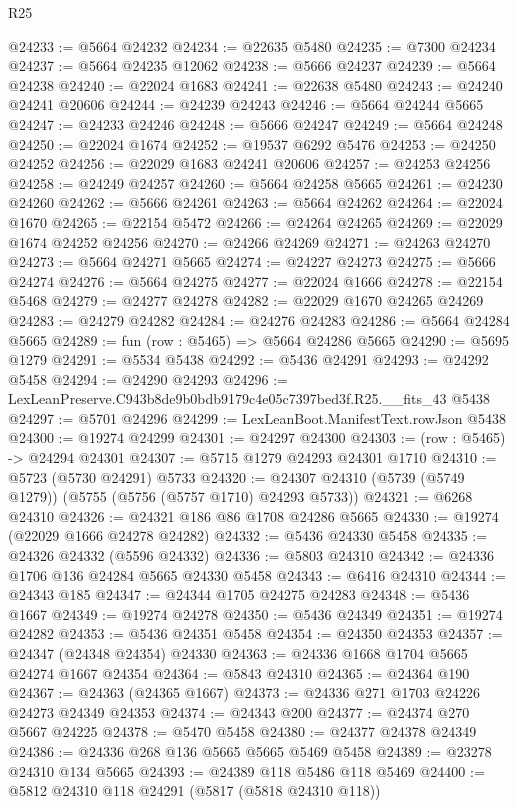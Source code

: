 \begin{lexlean}{R25}
\begin{coremodule}
@24233 := @5664 @24232
@24234 := @22635 @5480
@24235 := @7300 @24234
@24237 := @5664 @24235 @12062
@24238 := @5666 @24237
@24239 := @5664 @24238
@24240 := @22024 @1683
@24241 := @22638 @5480
@24243 := @24240 @24241 @20606
@24244 := @24239 @24243
@24246 := @5664 @24244 @5665
@24247 := @24233 @24246
@24248 := @5666 @24247
@24249 := @5664 @24248
@24250 := @22024 @1674
@24252 := @19537 @6292 @5476
@24253 := @24250 @24252
@24256 := @22029 @1683 @24241 @20606
@24257 := @24253 @24256
@24258 := @24249 @24257
@24260 := @5664 @24258 @5665
@24261 := @24230 @24260
@24262 := @5666 @24261
@24263 := @5664 @24262
@24264 := @22024 @1670
@24265 := @22154 @5472
@24266 := @24264 @24265
@24269 := @22029 @1674 @24252 @24256
@24270 := @24266 @24269
@24271 := @24263 @24270
@24273 := @5664 @24271 @5665
@24274 := @24227 @24273
@24275 := @5666 @24274
@24276 := @5664 @24275
@24277 := @22024 @1666
@24278 := @22154 @5468
@24279 := @24277 @24278
@24282 := @22029 @1670 @24265 @24269
@24283 := @24279 @24282
@24284 := @24276 @24283
@24286 := @5664 @24284 @5665
@24289 := fun (row : @5465) => @5664 @24286 @5665
@24290 := @5695 @1279
@24291 := @5534 @5438
@24292 := @5436 @24291
@24293 := @24292 @5458
@24294 := @24290 @24293
@24296 := LexLeanPreserve.C943b8de9b0bdb9179c4e05c7397bed3f.R25.__fits_43 @5438
@24297 := @5701 @24296
@24299 := LexLeanBoot.ManifestText.rowJson @5438
@24300 := @19274 @24299
@24301 := @24297 @24300
@24303 := (row : @5465) -> @24294 @24301
@24307 := @5715 @1279 @24293 @24301 @1710
@24310 := @5723 (@5730 @24291) @5733
@24320 := @24307 @24310 (@5739 (@5749 @1279)) (@5755 (@5756 (@5757 @1710) @24293 @5733))
@24321 := @6268 @24310
@24326 := @24321 @186 @86 @1708 @24286 @5665
@24330 := @19274 (@22029 @1666 @24278 @24282)
@24332 := @5436 @24330 @5458
@24335 := @24326 @24332 (@5596 @24332)
@24336 := @5803 @24310
@24342 := @24336 @1706 @136 @24284 @5665 @24330 @5458
@24343 := @6416 @24310
@24344 := @24343 @185
@24347 := @24344 @1705 @24275 @24283
@24348 := @5436 @1667
@24349 := @19274 @24278
@24350 := @5436 @24349
@24351 := @19274 @24282
@24353 := @5436 @24351 @5458
@24354 := @24350 @24353
@24357 := @24347 (@24348 @24354) @24330
@24363 := @24336 @1668 @1704 @5665 @24274 @1667 @24354
@24364 := @5843 @24310
@24365 := @24364 @190
@24367 := @24363 (@24365 @1667)
@24373 := @24336 @271 @1703 @24226 @24273 @24349 @24353
@24374 := @24343 @200
@24377 := @24374 @270 @5667 @24225
@24378 := @5470 @5458
@24380 := @24377 @24378 @24349
@24386 := @24336 @268 @136 @5665 @5665 @5469 @5458
@24389 := @23278 @24310 @134 @5665
@24393 := @24389 @118 @5486 @118 @5469
@24400 := @5812 @24310 @118 @24291 (@5817 (@5818 @24310 @118))

\end{coremodule}
\end{lexlean}
